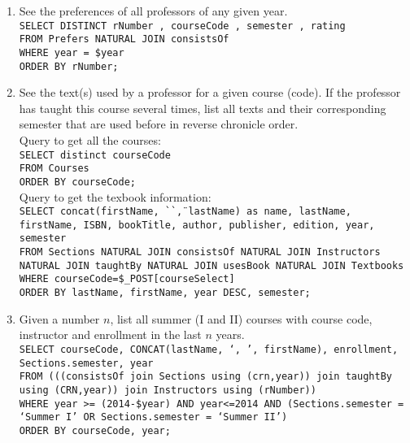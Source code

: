\begin{enumerate}
\begin{enumerate}
			\item 	 See the preferences of all professors of any given year.\\
			
					\texttt{SELECT DISTINCT rNumber , courseCode , semester , rating\\
							FROM Prefers NATURAL JOIN consistsOf\\
							WHERE year = \$year\\
							ORDER BY rNumber;}\\
			
			\item 	See the text(s) used by a professor for a given course (code). If the professor has taught this course several times, list all texts and their corresponding semester that are used before in reverse chronicle order.\\

					Query to get all the courses:\\
					\texttt{SELECT distinct courseCode\\
							FROM Courses\\
							ORDER BY courseCode;}\\

					Query to get the texbook information:\\
					\texttt{SELECT concat(firstName, \`` \", lastName) as name, lastName, firstName, ISBN, bookTitle, author, publisher, edition, year, semester\\
							FROM Sections NATURAL JOIN consistsOf NATURAL JOIN Instructors NATURAL JOIN taughtBy NATURAL JOIN usesBook NATURAL JOIN Textbooks\\
							WHERE courseCode=\$\_POST[courseSelect]\\
							ORDER BY lastName, firstName, year DESC, semester;}\\
							
			\item 	Given a number $n$, list all summer (I and II) courses with course code, instructor and enrollment in the last $n$ years.\\

					\texttt{SELECT courseCode, CONCAT(lastName, `, ', firstName), enrollment, Sections.semester, year\\
							FROM (((consistsOf join Sections using (crn,year)) join taughtBy using (CRN,year)) join Instructors using (rNumber))\\
							WHERE year >= (2014-\$year) AND year<=2014 AND (Sections.semester = `Summer I' OR Sections.semester = `Summer II')\\
							ORDER BY courseCode, year;}\\
	

\end{enumerate}
\end{enumerate}
